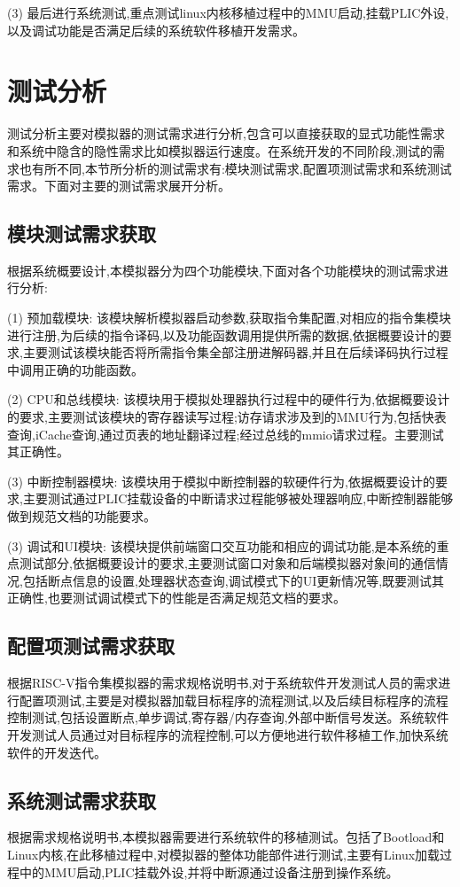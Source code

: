 (3) 最后进行系统测试,重点测试linux内核移植过程中的MMU启动,挂载PLIC外设,以及调试功能是否满足后续的系统软件移植开发需求。


\section{测试分析}
测试分析主要对模拟器的测试需求进行分析,包含可以直接获取的显式功能性需求和系统中隐含的隐性需求比如模拟器运行速度。在系统开发的不同阶段,测试的需求也有所不同,本节所分析的测试需求有:模块测试需求,配置项测试需求和系统测试需求。下面对主要的测试需求展开分析。

\subsection{模块测试需求获取}
根据系统概要设计,本模拟器分为四个功能模块,下面对各个功能模块的测试需求进行分析:


(1) 预加载模块: 该模块解析模拟器启动参数,获取指令集配置,对相应的指令集模块进行注册,为后续的指令译码,以及功能函数调用提供所需的数据,依据概要设计的要求,主要测试该模块能否将所需指令集全部注册进解码器,并且在后续译码执行过程中调用正确的功能函数。


(2) CPU和总线模块: 该模块用于模拟处理器执行过程中的硬件行为,依据概要设计的要求,主要测试该模块的寄存器读写过程;访存请求涉及到的MMU行为,包括快表查询,iCache查询,通过页表的地址翻译过程;经过总线的mmio请求过程。主要测试其正确性。


(3) 中断控制器模块: 该模块用于模拟中断控制器的软硬件行为,依据概要设计的要求,主要测试通过PLIC挂载设备的中断请求过程能够被处理器响应,中断控制器能够做到规范文档的功能要求。

(3) 调试和UI模块: 该模块提供前端窗口交互功能和相应的调试功能,是本系统的重点测试部分,依据概要设计的要求,主要测试窗口对象和后端模拟器对象间的通信情况,包括断点信息的设置,处理器状态查询,调试模式下的UI更新情况等,既要测试其正确性,也要测试调试模式下的性能是否满足规范文档的要求。


\subsection{配置项测试需求获取}
根据RISC-V指令集模拟器的需求规格说明书,对于系统软件开发测试人员的需求进行配置项测试,主要是对模拟器加载目标程序的流程测试,以及后续目标程序的流程控制测试,包括设置断点,单步调试,寄存器/内存查询,外部中断信号发送。系统软件开发测试人员通过对目标程序的流程控制,可以方便地进行软件移植工作,加快系统软件的开发迭代。

\subsection{系统测试需求获取}
根据需求规格说明书,本模拟器需要进行系统软件的移植测试。包括了Bootload和Linux内核,在此移植过程中,对模拟器的整体功能部件进行测试,主要有Linux加载过程中的MMU启动,PLIC挂载外设,并将中断源通过设备注册到操作系统。

